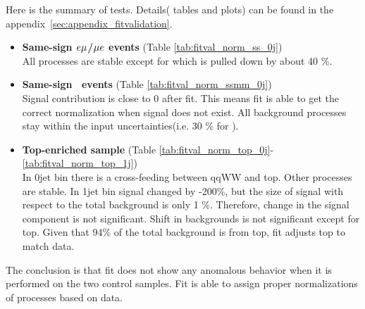 Here is the summary of tests. Details( tables and plots) can be found in the 
appendix~\ref{sec:appendix_fitvalidation}. 
\begin{itemize}
    \item{\textbf{Same-sign $e\mu$/$\mu e$ events} (Table \ref{tab:fitval_norm_ss_0j}) \\ }  
        All processes are stable except for \Wgstar which is pulled down by about 40 \%.  
    \item{\textbf{Same-sign \M\M~events} (Table \ref{tab:fitval_norm_ssmm_0j}) \\ }  
        Signal contribution is close to 0 after fit. This means fit is able to 
        get the correct normalization when signal does not exist. All background 
        processes stay within the input uncertainties(i.e. 30 \% for  \Wgstar ).   
    \item{\textbf{Top-enriched sample} (Table \ref{tab:fitval_norm_top_0j}-\ref{tab:fitval_norm_top_1j}) \\ }  
        In 0jet bin there is a cross-feeding between qqWW and top. Other processes are stable. 
        In 1jet bin signal changed by -200\%, but the size of signal with respect to the total background 
        is only 1 \%. Therefore, change in the signal component is not significant. 
        Shift in backgrounds is not significant except for top. 
        Given that 94\% of the total background is from top, fit adjusts top to match data.  
\end{itemize} 

The conclusion is that fit does not show any anomalous behavior
when it is performed on the two control samples. Fit is able to assign 
proper normalizations of processes based on data.   

